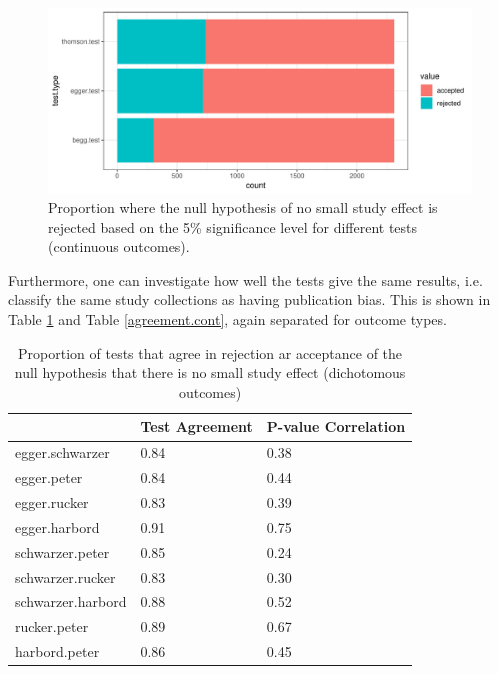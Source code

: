\documentclass[11pt,a4paper,twoside]{book}\usepackage[]{graphicx}\usepackage[]{color}
\makeatletter
\newenvironment{kframe}{%
 \def\at@end@of@kframe{}%
 \ifinner\ifhmode%
  \def\at@end@of@kframe{\end{minipage}}%
  \begin{minipage}{\columnwidth}%
 \fi\fi%
 \def\FrameCommand##1{\hskip\@totalleftmargin \hskip-\fboxsep
 \colorbox{shadecolor}{##1}\hskip-\fboxsep
     \hskip-\linewidth \hskip-\@totalleftmargin \hskip\columnwidth}%
 \MakeFramed {\advance\hsize-\width
   \@totalleftmargin\z@ \linewidth\hsize
   \@setminipage}}%
 {\par\unskip\endMakeFramed%
 \at@end@of@kframe}
\newenvironment{knitrout}{}{} %
\makeatother
\begin{document}
\begin{figure}
\begin{knitrout}
\color{fgcolor}

{\centering \includegraphics[width=\textwidth-3cm]{figure/ch02_figunnamed-chunk-19-1} 

}



\end{knitrout}
\caption{Proportion where the null hypothesis of no small study effect is rejected based on the 5\% significance level for different tests (continuous outcomes).}
\label{bias.results.cont}
\end{figure}

Furthermore, one can investigate how well the tests give the same results, i.e. classify the same study collections as having publication bias. This is shown in Table \ref{agreement.bin} and Table \ref{agreement.cont}, again separated for outcome types.

\begin{kframe}


{\ttfamily\noindent\color{warningcolor}{\#\# Warning: Setting row names on a tibble is deprecated.}}\end{kframe}%
\begin{table}[ht]
\centering
\begingroup\footnotesize
\begin{tabular}{lll}
  \hline
 & Test Agreement & P-value Correlation \\ 
  \hline
egger.schwarzer & 0.84 & 0.38 \\ 
  egger.peter & 0.84 & 0.44 \\ 
  egger.rucker & 0.83 & 0.39 \\ 
  egger.harbord & 0.91 & 0.75 \\ 
  schwarzer.peter & 0.85 & 0.24 \\ 
  schwarzer.rucker & 0.83 & 0.30 \\ 
  schwarzer.harbord & 0.88 & 0.52 \\ 
  rucker.peter & 0.89 & 0.67 \\ 
  harbord.peter & 0.86 & 0.45 \\ 
   \hline
\end{tabular}
\endgroup
\caption{Proportion of tests that agree in rejection ar acceptance of the null hypothesis that there is no small study effect (dichotomous outcomes)} 
\label{agreement.bin}
\end{table}
\end{document}
